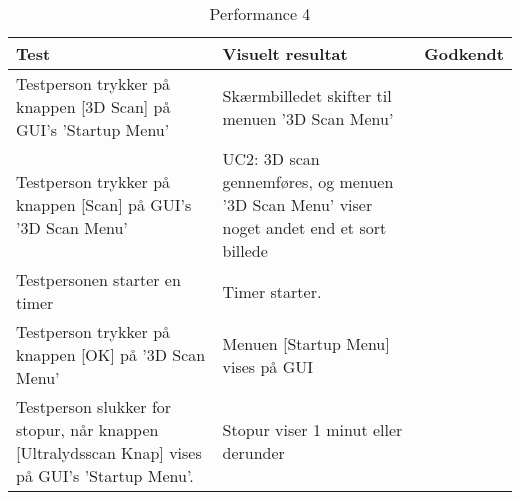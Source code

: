 \begin{table}[htb]
\begin{tabularx}{\textwidth}{|X|X|p{2cm}|}
\hline
\textbf{Test} & \textbf{Visuelt resultat} &\textbf{Godkendt}\\\hline
Testperson trykker på knappen [3D Scan] på GUI's 'Startup Menu' & Skærmbilledet skifter til menuen '3D Scan Menu' &  \\\hline
Testperson trykker på knappen [Scan] på GUI's '3D Scan Menu' & UC2: 3D scan gennemføres, og menuen '3D Scan Menu' viser noget andet end et sort billede & \\\hline
Testpersonen starter en timer & Timer starter. & \\\hline
Testperson trykker på knappen [OK] på '3D Scan Menu' & Menuen [Startup Menu] vises på GUI & \\\hline
Testperson slukker for stopur, når knappen [Ultralydsscan Knap] vises på GUI's 'Startup Menu'. & Stopur viser 1 minut eller derunder & \\\hline
\end{tabularx} 
\caption{Performance 4}
\label{P4}
\end{table}
\newpage